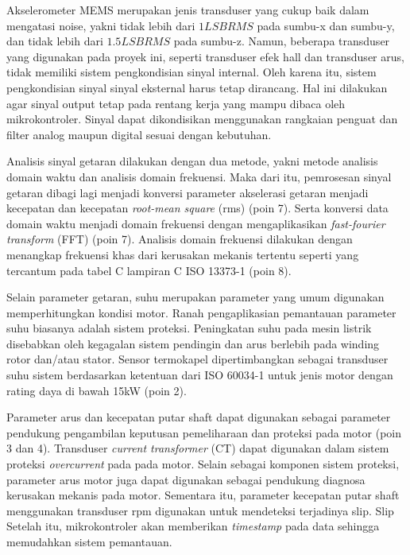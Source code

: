\documentclass{elsinta}
\begin{document}
Akselerometer MEMS merupakan jenis transduser yang
cukup baik dalam mengatasi noise, yakni tidak lebih dari 
$1 LSB RMS$ pada sumbu-x dan sumbu-y, dan tidak lebih dari 
$1.5 LSB RMS$ pada sumbu-z\cite{ADXL345}.
Namun, beberapa transduser yang digunakan pada proyek ini,
seperti transduser efek hall\cite{A3144} dan transduser arus\cite{ACS712}, 
tidak memiliki sistem pengkondisian sinyal internal.
Oleh karena itu, sistem pengkondisian sinyal sinyal eksternal harus
tetap dirancang. Hal ini dilakukan agar sinyal output tetap pada rentang
kerja yang mampu dibaca oleh mikrokontroler. Sinyal
dapat dikondisikan menggunakan rangkaian penguat dan filter
analog maupun digital sesuai dengan kebutuhan.

Analisis sinyal getaran dilakukan
dengan dua metode, yakni metode analisis domain waktu
dan analisis domain frekuensi. Maka dari itu,
pemrosesan sinyal getaran dibagi lagi menjadi
konversi parameter akselerasi getaran
menjadi kecepatan dan kecepatan \textit{root-mean square} (rms) (poin 7). Serta konversi
data domain waktu menjadi domain frekuensi dengan mengaplikasikan
\textit{fast-fourier
transform} (FFT)\cite{2.1.5} (poin 7). Analisis domain frekuensi
dilakukan dengan menangkap frekuensi khas dari kerusakan
mekanis tertentu seperti yang tercantum pada tabel C
lampiran C ISO 13373-1\cite{2.1.4} (poin 8).

Selain parameter getaran, suhu merupakan parameter yang umum digunakan
memperhitungkan kondisi motor. Ranah pengaplikasian pemantauan
parameter suhu biasanya adalah sistem proteksi\cite{3.1.2}. Peningkatan
suhu pada mesin listrik disebabkan oleh kegagalan sistem pendingin
dan arus berlebih pada winding rotor dan/atau stator\cite{3.1.3}. 
Sensor termokapel dipertimbangkan sebagai transduser suhu sistem
berdasarkan ketentuan dari ISO 60034-1 untuk jenis motor dengan
rating daya di bawah 15kW\cite{IEC60034} (poin 2). 

Parameter arus dan kecepatan putar shaft dapat 
digunakan sebagai 
parameter pendukung pengambilan keputusan pemeliharaan dan proteksi 
pada motor (poin 3 dan 4). Transduser \textit{current transformer} (CT)
dapat digunakan dalam sistem proteksi
\textit{overcurrent} pada pada motor\cite{3.1.4}. Selain sebagai komponen
sistem proteksi, parameter arus motor juga dapat digunakan sebagai pendukung diagnosa
kerusakan mekanis pada motor\cite{1.1.2}. 
Sementara itu, parameter kecepatan putar shaft menggunakan
transduser rpm digunakan untuk mendeteksi terjadinya slip.
Slip
Setelah itu,
mikrokontroler akan memberikan
\textit{timestamp} pada data sehingga memudahkan 
sistem pemantauan.
\end{document}
